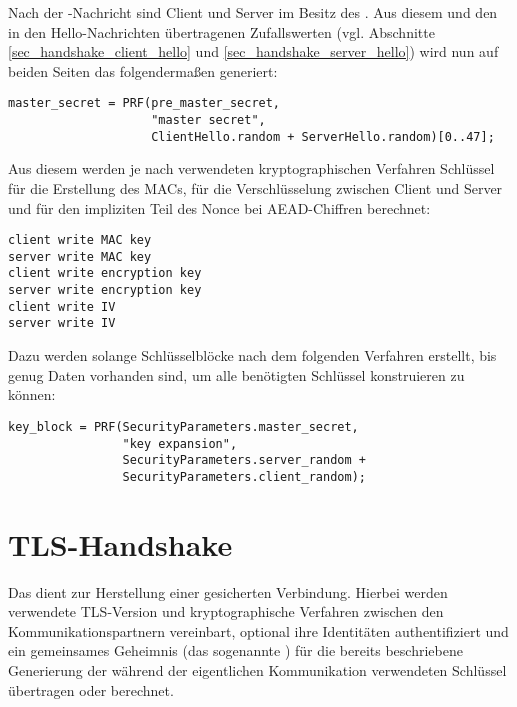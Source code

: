 Nach der \clientkeyexchange{}-Nachricht sind Client und Server im Besitz des \premastersecret{}. Aus diesem und den in den Hello-Nachrichten übertragenen Zufallswerten (vgl. Abschnitte \ref{sec_handshake_client_hello} und \ref{sec_handshake_server_hello}) wird nun auf beiden Seiten das \mastersecret{} folgendermaßen generiert:

\begin{lstlisting}
master_secret = PRF(pre_master_secret, 
					"master secret",
					ClientHello.random + ServerHello.random)[0..47];
\end{lstlisting}

Aus diesem \mastersecret{} werden je nach verwendeten kryptographischen Verfahren Schlüssel für die Erstellung des MACs, für die Verschlüsselung zwischen Client und Server und für den impliziten Teil des Nonce bei AEAD-Chiffren berechnet:
\begin{lstlisting}
client write MAC key
server write MAC key
client write encryption key
server write encryption key
client write IV
server write IV
\end{lstlisting}

Dazu werden solange Schlüsselblöcke nach dem folgenden Verfahren erstellt, bis genug Daten vorhanden sind, um alle benötigten Schlüssel konstruieren zu können: 

\begin{lstlisting}
key_block = PRF(SecurityParameters.master_secret,
                "key expansion",
                SecurityParameters.server_random +
                SecurityParameters.client_random);
\end{lstlisting}


\section{TLS-Handshake}

\label{sec_tls_handshake}

Das \handshakeprotocol{} dient zur Herstellung einer gesicherten Verbindung. Hierbei werden verwendete TLS-Version und kryptographische Verfahren zwischen den Kommunikationspartnern vereinbart, optional ihre Identitäten authentifiziert und ein gemeinsames Geheimnis (das sogenannte \premastersecret{}) für die bereits beschriebene Generierung der während der eigentlichen Kommunikation verwendeten Schlüssel übertragen oder berechnet. 



